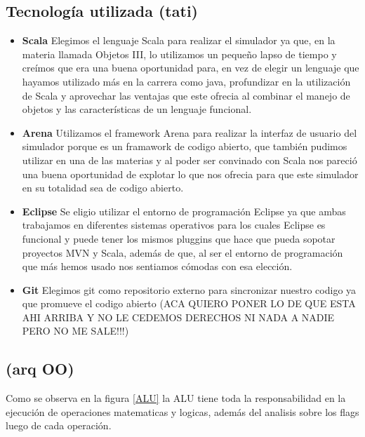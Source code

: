 \subsection{Tecnología utilizada (tati)}

\begin{itemize}


\item  \textbf{Scala}
Elegimos el lenguaje Scala para realizar el simulador ya que, en la materia llamada Objetos III, lo utilizamos un pequeño lapso de tiempo y creímos que era una buena oportunidad para, en vez de elegir un lenguaje que hayamos utilizado más en la carrera como java, profundizar en la utilización de Scala y aprovechar las ventajas que este ofrecia al combinar el manejo de objetos y las características de un lenguaje funcional.

\item  \textbf{Arena}
Utilizamos el framework Arena para realizar la interfaz de usuario del simulador porque es un framawork de codigo abierto, que también pudimos utilizar en una de las materias y al poder ser convinado con Scala nos pareció una buena oportunidad de explotar lo que nos ofrecia para que este simulador en su totalidad sea de codigo abierto.

\item  \textbf{Eclipse}
Se eligio utilizar el entorno de programación Eclipse ya que ambas trabajamos en diferentes sistemas operativos para los cuales Eclipse es funcional y puede tener los mismos pluggins que hace que pueda sopotar proyectos MVN y Scala, además de que, al ser el entorno de programación que más hemos usado nos sentiamos cómodas con esa elección.

\item  \textbf{Git}
Elegimos git como repositorio externo para sincronizar nuestro codigo ya que promueve el codigo abierto (ACA QUIERO PONER LO DE QUE ESTA AHI ARRIBA Y NO LE CEDEMOS DERECHOS NI NADA  A NADIE PERO NO ME SALE!!!)

\end{itemize}

\subsection{ (arq OO)}

Como se observa en la figura \ref{ALU} la ALU tiene toda la responsabilidad en la ejecución de operaciones matematicas y logicas, además del analisis sobre los flags luego de cada operación. 


